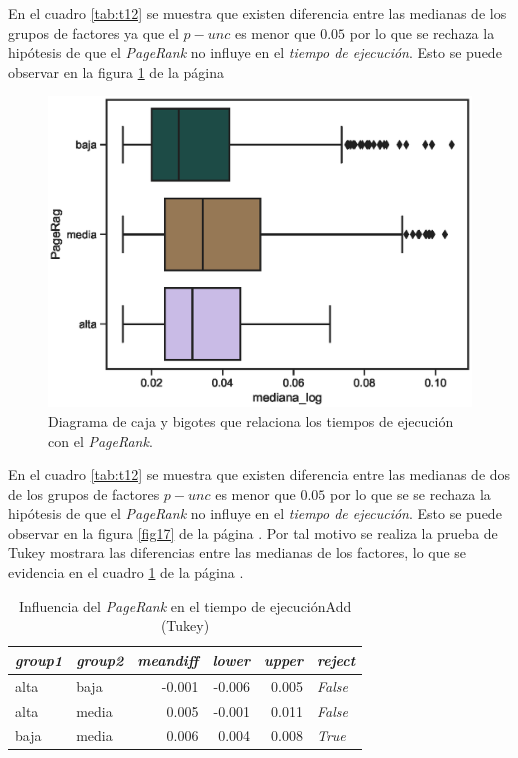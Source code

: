 \documentclass{article}
\begin{document}
En el cuadro \ref{tab:t12} se muestra que existen diferencia entre las medianas de los grupos de factores ya que el \emph{$p-unc$} es menor que $0.05$ por lo que se rechaza la hipótesis de que el \textit{PageRank} no influye en el \textit{tiempo de ejecución}. Esto se puede observar en la figura \ref{fig18} de la página \pageref{fig18}

\begin{center}
\begin{figure}[htbp]
\includegraphics[scale=0.6]{boxplot_PageRag.eps}
\caption{Diagrama de caja y bigotes que relaciona los tiempos de ejecución con el \textit{PageRank}.}
\label{fig18}
\end{figure}
\end{center}


En el cuadro \ref{tab:t12} se muestra que existen  diferencia entre las medianas de dos de los grupos de factores  \textbf{$p-unc$} es menor que $0.05$ por lo que se se rechaza la hipótesis de que el \textit{PageRank} no influye en el \textit{tiempo de ejecución}. Esto se puede observar en la figura \ref{fig17} de la página \pageref{fig17}. Por tal motivo se realiza la prueba de Tukey mostrara las diferencias entre las medianas de los factores, lo que se evidencia en el cuadro \ref{tab:t19} de la página \pageref{tab:t19}.

\begin{table}[htbp]
  \centering
  \caption{Influencia del \textit{PageRank} en el tiempo de ejecuciónAdd (Tukey)}
    \begin{tabular}{llrrrl}
    \toprule
    \textit{\textbf{group1}} & \textit{\textbf{group2}} & \multicolumn{1}{l}{\textit{\textbf{meandiff}}} & \multicolumn{1}{l}{\textit{\textbf{lower}}} & \multicolumn{1}{l}{\textit{\textbf{upper}}} & \textit{\textbf{reject}} \\
    \midrule
    alta  & baja  & -0.001 & -0.006 & 0.005 & \textit{False} \\
    alta  & media & 0.005 & -0.001 & 0.011 & \textit{False} \\
    baja  & media & 0.006 & 0.004 & 0.008 & \textit{True} \\
    \bottomrule
    \end{tabular}%
  \label{tab:t19}%
\end{table}%
\end{document}
